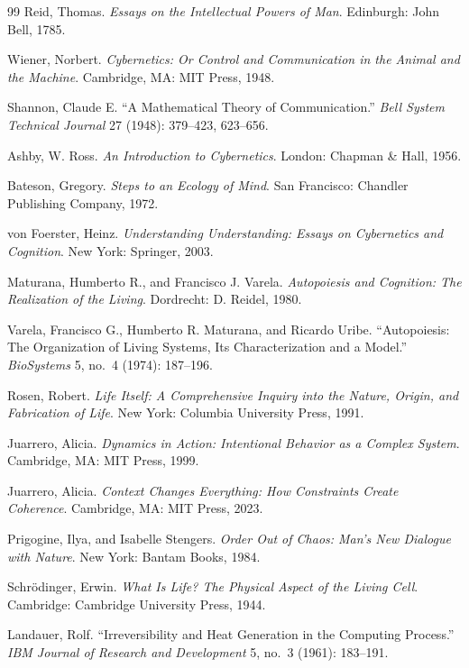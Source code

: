 \documentclass[
  11pt,
  a4paper,
  DIV=12,
  BCOR=0mm,
  parskip=half-
]{scrartcl}
\theoremstyle{definition}
\theoremstyle{plain}
\theoremstyle{remark}
\begin{document}
\begin{thebibliography}{99}
Reid, Thomas.
\emph{Essays on the Intellectual Powers of Man}.
Edinburgh: John Bell, 1785.

Wiener, Norbert.
\emph{Cybernetics: Or Control and Communication in the Animal and the
Machine}.
Cambridge, MA: MIT Press, 1948.

Shannon, Claude E.
``A Mathematical Theory of Communication.''
\emph{Bell System Technical Journal}
27 (1948): 379--423, 623--656.

Ashby, W. Ross.
\emph{An Introduction to Cybernetics}.
London: Chapman \& Hall, 1956.

Bateson, Gregory.
\emph{Steps to an Ecology of Mind}.
San Francisco: Chandler Publishing Company, 1972.

von Foerster, Heinz.
\emph{Understanding Understanding: Essays on Cybernetics and Cognition}.
New York: Springer, 2003.

Maturana, Humberto R., and Francisco J. Varela.
\emph{Autopoiesis and Cognition: The Realization of the Living}.
Dordrecht: D. Reidel, 1980.

Varela, Francisco G., Humberto R. Maturana, and Ricardo Uribe.
``Autopoiesis: The Organization of Living Systems, Its Characterization and
a Model.''
\emph{BioSystems}
5, no.~4 (1974): 187--196.

Rosen, Robert.
\emph{Life Itself: A Comprehensive Inquiry into the Nature, Origin, and
Fabrication of Life}.
New York: Columbia University Press, 1991.

Juarrero, Alicia.
\emph{Dynamics in Action: Intentional Behavior as a Complex System}.
Cambridge, MA: MIT Press, 1999.

Juarrero, Alicia.
\emph{Context Changes Everything: How Constraints Create Coherence}.
Cambridge, MA: MIT Press, 2023.

Prigogine, Ilya, and Isabelle Stengers.
\emph{Order Out of Chaos: Man's New Dialogue with Nature}.
New York: Bantam Books, 1984.

Schr\"odinger, Erwin.
\emph{What Is Life? The Physical Aspect of the Living Cell}.
Cambridge: Cambridge University Press, 1944.

Landauer, Rolf.
``Irreversibility and Heat Generation in the Computing Process.''
\emph{IBM Journal of Research and Development}
5, no.~3 (1961): 183--191.


\end{thebibliography}
\end{document}
